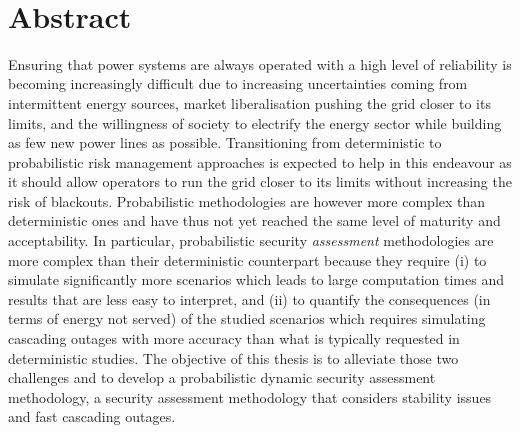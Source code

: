 \addtocounter{page}{-2}
\thispagestyle{empty}
~\newpage

\chapter*{Abstract}

Ensuring that power systems are always operated with a high level of reliability is becoming increasingly difficult due to increasing uncertainties coming from intermittent energy sources, market liberalisation pushing the grid closer to its limits, and the willingness of society to electrify the energy sector while building as few new power lines as possible. Transitioning from deterministic to probabilistic risk management approaches is expected to help in this endeavour as it should allow operators to run the grid closer to its limits without increasing the risk of blackouts. Probabilistic methodologies are however more complex than deterministic ones and have thus not yet reached the same level of maturity and acceptability. In particular, probabilistic security \emph{assessment} methodologies are more complex than their deterministic counterpart because they require (i) to simulate significantly more scenarios which leads to large computation times and results that are less easy to interpret, and (ii) to quantify the consequences (\eg in terms of energy not served) of the studied scenarios which requires simulating cascading outages with more accuracy than what is typically requested in deterministic studies. The objective of this thesis is to alleviate those two challenges and to develop a probabilistic dynamic security assessment methodology, \ie a security assessment methodology that considers stability issues and fast cascading outages.

